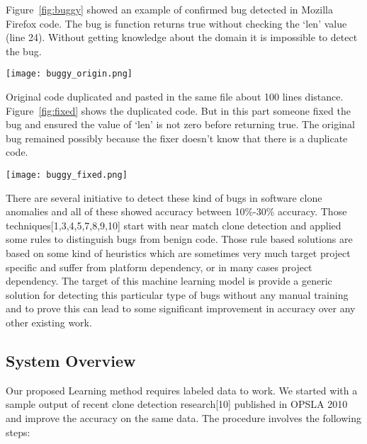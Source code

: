 \documentclass[11pt]{article}
\begin{document}
\vspace{10 pt}
\noindent
Figure~\ref{fig:buggy} showed an example of confirmed bug detected in Mozilla Firefox code. The bug is function returns true without checking the ‘len’ value (line 24). Without getting knowledge about the domain it is impossible to detect the bug.

\begin{figure*}[t!]
\centering
\texttt{[image: buggy\_origin.png]}
\caption{Buggy copy of the clone}
\label{fig:buggy}
\end{figure*}

\vspace{10 pt}
\noindent
Original code duplicated and pasted in the same file about 100 lines distance. Figure~\ref{fig:fixed} shows the duplicated code. But in this part someone fixed the bug and ensured the value of ‘len’ is not zero before returning true. The original bug remained possibly because the fixer doesn’t know that there is a duplicate code.

\begin{figure*}[t!]
\centering
\texttt{[image: buggy\_fixed.png]}
\caption{Fixed copy of the clone}
\label{fig:fixed}
\end{figure*}

\vspace{10 pt}
\noindent
There are several initiative to detect these kind of bugs in software clone anomalies and all of these showed accuracy between 10\%-30\% accuracy. Those techniques[1,3,4,5,7,8,9,10] start with near match clone detection and applied some rules to distinguish bugs from benign code. Those rule based solutions are based on some kind of heuristics which are sometimes very much target project specific and suffer from platform dependency, or in many cases project dependency. The target of this machine learning model is provide a generic solution for detecting this particular type of bugs without any manual training and to prove this can lead to some significant improvement in accuracy over any other existing work.

\subsection{System Overview}
Our proposed Learning method requires labeled data to work. We started with a sample output of recent clone detection research[10] published in OPSLA 2010 and improve the accuracy on the same data. The procedure involves the following steps:
\end{document}
